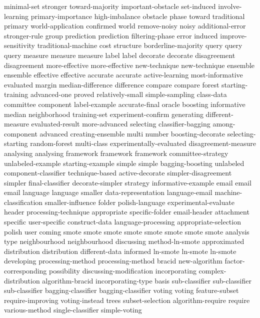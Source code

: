 minimal-set	
stronger	
toward-majority	
important-obstacle	
set-induced	
involve-learning	
primary-importance	
high-imbalance	
obstacle	
phase	
toward	
traditional	
primary	
world-application	
confirmed	
world	
remove-noisy	
noisy	
additional-error	
stronger-rule	
group	
prediction	prediction	
filtering-phase	
error	
induced	
improve-sensitivity	
traditional-machine	
cost	
structure	
borderline-majority	
query	query	query	
measure	measure	measure	
label	label	
decorate	decorate	
disagreement	disagreement	
more-effective	more-effective	
new-technique	new-technique	
ensemble	ensemble	
effective	effective	
accurate	accurate	
active-learning	
most-informative	
evaluated	
margin	
median-difference	
difference	
compare	compare	
forest	
starting-training	
advanced-one	
proved	
relatively-small	
simple-sampling	
class-data	
committee	
component	
label-example	
accurate-final	
oracle	
boosting	
informative	
median	
neighborhood	
training-set	
experiment-confirm	
generating	
different-measure	
evaluated-result	
more-advanced	
selecting	
classifier-bagging	
among-component	
advanced	
creating-ensemble	
multi	
number	
boosting-decorate	
selecting-starting	
random-forest	
multi-class	
experimentally-evaluated	
disagreement-measure	
analysing	analysing	
framework	framework	framework	
committee-strategy	
unlabeled-example	
starting-example	
simple	simple	
bagging-boosting	
unlabeled	
component-classifier	
technique-based	
active-decorate	
simpler-disagreement	
simpler	
final-classifier	
decorate-simpler	
strategy	
informative-example	
email	email	email	
language	language	
smaller	
data-representation	
language-email	
machine-classification	
smaller-influence	
folder	
polish-language	
experimental-evaluate	
header	
processing-technique	
appropriate	
specific-folder	
email-header	
attachment	
specific	
user-specific	
construct-data	
language-processing	
appropriate-selection	
polish	
user	
coming	
smote	smote	smote	smote	smote	smote	smote	smote	
analysis	
type	
neighbourhood	neighbourhood	
discussing	
method-ln-smote	
approximated	
distribution	distribution	
different-data	
informed	
ln-smote	ln-smote	ln-smote	
developing	
processing-method	processing-method	
bracid	
new-algorithm	
factor-corresponding	
possibility	
discussing-modification	
incorporating	
complex-distribution	
algorithm-bracid	
incorporating-type	
basis	
sub-classifier	sub-classifier	sub-classifier	
bagging-classifier	bagging-classifier	
voting	voting	
feature-subset	
require-improving	
voting-instead	
trees	
subset-selection	
algorithm-require	
require	
various-method	
single-classifier	
simple-voting	
